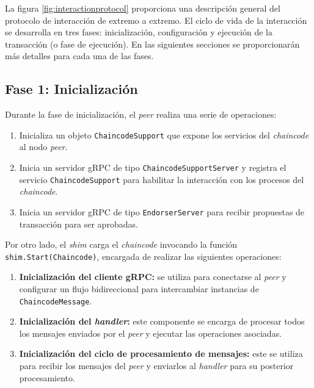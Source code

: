 La figura \ref{fig:interactionprotocol} proporciona una descripción general del protocolo de interacción de extremo a extremo. El ciclo de vida de la interacción se desarrolla en tres fases: inicialización, configuración y ejecución de la transacción (o fase de ejecución). En las siguientes secciones se proporcionarán más detalles para cada una de las fases.

\subsection*{Fase 1: Inicialización}
Durante la fase de inicialización, el \textit{peer} realiza una serie de operaciones:

\begin{enumerate}

\item Inicializa un objeto \texttt{ChaincodeSupport} que expone los servicios del \textit{chaincode} al nodo \textit{peer}.

\item Inicia un servidor gRPC de tipo \texttt{ChaincodeSupportServer} y registra el servicio \texttt{ChaincodeSupport} para habilitar la interacción con los procesos del \textit{chaincode}.

\item Inicia un servidor gRPC de tipo \texttt{EndorserServer}  para recibir propuestas de transacción para ser aprobadas.
\end{enumerate}

Por otro lado, el \textit{shim} carga el \textit{chaincode} invocando la función  \texttt{shim.Start(Chaincode)}, encargada de realizar las siguientes operaciones:

\begin{enumerate}
\item \textbf{Inicialización del cliente gRPC:} se utiliza para conectarse al \textit{peer} y configurar un flujo bidireccional para intercambiar instancias de \texttt{ChaincodeMessage}.

\item \textbf{Inicialización del \textit{handler}:} este componente se encarga de procesar todos los mensajes enviados por el \textit{peer} y ejecutar las operaciones asociadas.

\item \textbf{Inicialización del ciclo de procesamiento de mensajes:} este se utiliza para recibir los mensajes del \textit{peer} y enviarlos al \textit{handler} para su posterior procesamiento.
\end{enumerate}

